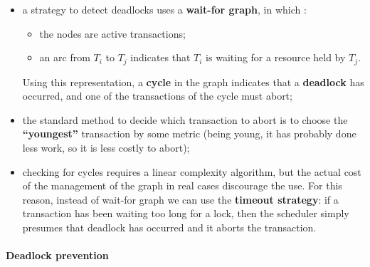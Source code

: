\begin{itemize}

    \item a strategy to detect deadlocks uses a \textbf{wait-for graph}, in which :
    
    \begin{itemize}
    
        \item the nodes are active transactions;
        
        \item an arc from $T_i$ to $T_j$ indicates that $T_i$ is waiting for a resource held by $T_j$.

    \end{itemize}  
    
    Using this representation, a \textbf{cycle} in the graph indicates that a \textbf{deadlock} has occurred, and one of the transactions of the cycle must abort;
    
    \item the standard method to decide which transaction to abort is to choose the \textbf{“youngest”} transaction by some metric (being young, it has probably done less work, so it is less costly to abort);
    
    \item checking for cycles requires a linear complexity algorithm, but the actual cost of the management of the graph in real cases discourage the use. For this reason, instead of wait-for graph we can use the \textbf{timeout strategy}: if a transaction has been waiting too long for a lock, then the scheduler simply presumes that deadlock has occurred and it aborts the transaction.

\end{itemize}

\paragraph{Deadlock prevention}

